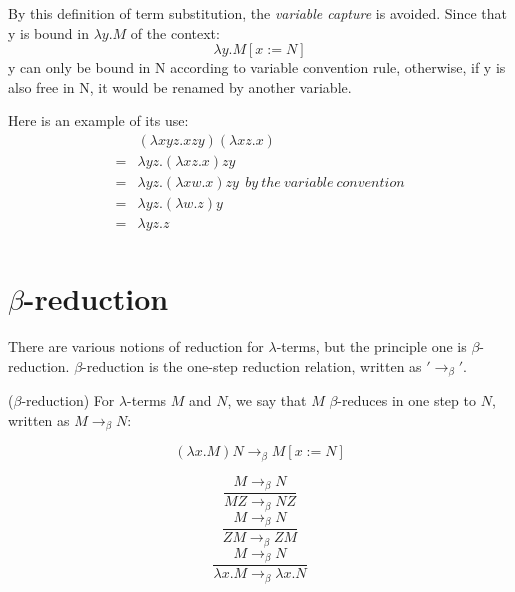 By this definition of term substitution, the \textit{variable capture} is avoided. Since that y is bound in $\lambda y.M$ of the context:
\begin{equation*}
\lambda y.M[x:=N]
\end{equation*}
y can only be bound in N according to variable convention rule, otherwise, if y is also free in N, it would be renamed by another variable. 

Here is an example of its use:
\begin{equation*}
\begin{array}{ll}
&(\lambda xyz.xzy)(\lambda xz.x)\\
=& \lambda yz.(\lambda xz.x)zy \\
=& \lambda yz.(\lambda xw.x)zy\ \ by\ the\ variable\ convention \\
=& \lambda yz.(\lambda w.z)y\\
=& \lambda yz.z\\
\end{array}
\end{equation*}

\section{$\beta$-reduction}

\noindent There are various notions of reduction for $\lambda$-terms, but the principle one is $\beta$-reduction. $\beta$-reduction is the one-step reduction relation, written as $'\rightarrow _\beta'$. 

\begin{def1}
($\beta$-reduction) For $\lambda$-terms $M$ and $N$, we say that $M$ $\beta$-reduces in one step to $N$, written as $M \rightarrow _\beta N$:
\end{def1}
\begin{equation*}
(\lambda x.M)N\rightarrow _\beta M[x:=N]
\end{equation*}

\begin{equation*}
\frac{M\rightarrow _\beta N}{MZ \rightarrow _\beta NZ}
\end{equation*}
\begin{equation*}
\frac{M\rightarrow _\beta N}{ZM \rightarrow _\beta ZM}
\end{equation*}
\begin{equation*}
\frac{M\rightarrow _\beta N}{\lambda x.M \rightarrow _\beta \lambda x.N}
\end{equation*}

